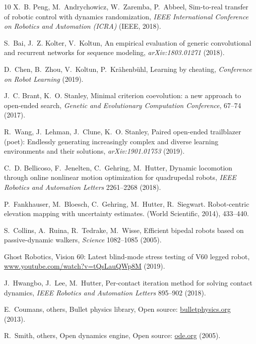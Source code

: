 \documentclass[9pt,twocolumn,twoside]{osajnl}
\begin{document}
\begin{thebibliography}{10}
X.~B. Peng, M.~Andrychowicz, W.~Zaremba, P.~Abbeel, Sim-to-real transfer of
  robotic control with dynamics randomization, {\it IEEE International
  Conference on Robotics and Automation (ICRA)\/} (IEEE, 2018).

S.~Bai, J.~Z. Kolter, V.~Koltun, An empirical evaluation of generic
  convolutional and recurrent networks for sequence modeling, {\it
  arXiv:1803.01271\/}  (2018).

D.~Chen, B.~Zhou, V.~Koltun, P.~Kr\"ahenb\"uhl, Learning by cheating, {\it
  Conference on Robot Learning\/} (2019).

J.~C. Brant, K.~O. Stanley, Minimal criterion coevolution: a new approach to
  open-ended search, {\it Genetic and Evolutionary Computation Conference\/},
  67--74 (2017).

R.~Wang, J.~Lehman, J.~Clune, K.~O. Stanley, Paired open-ended trailblazer
  (poet): Endlessly generating increasingly complex and diverse learning
  environments and their solutions, {\it arXiv:1901.01753\/}  (2019).

C.~D. Bellicoso, F.~Jenelten, C.~Gehring, M.~Hutter, Dynamic locomotion through
  online nonlinear motion optimization for quadrupedal robots, {\it IEEE
  Robotics and Automation Letters\/}  2261--2268 (2018).

P.~Fankhauser, M.~Bloesch, C.~Gehring, M.~Hutter, R.~Siegwart.
\newblock Robot-centric elevation mapping with uncertainty estimates.
 (World Scientific, 2014),  433--440.

S.~Collins, A.~Ruina, R.~Tedrake, M.~Wisse, Efficient bipedal robots based on
  passive-dynamic walkers, {\it Science\/}  1082--1085 (2005).

{Ghost Robotics}, Vision 60: Latest blind-mode stress testing of {V60} legged
  robot, \url{www.youtube.com/watch?v=tQsLauQWp8M} (2019).

J.~Hwangbo, J.~Lee, M.~Hutter, Per-contact iteration method for solving contact
  dynamics, {\it IEEE Robotics and Automation Letters\/}  895--902 (2018).

E.~Coumans, others, Bullet physics library, Open source:
  \url{bulletphysics.org} (2013).

R.~Smith, others, Open dynamics engine, Open source: \url{ode.org} (2005).


\end{thebibliography}
\end{document}
